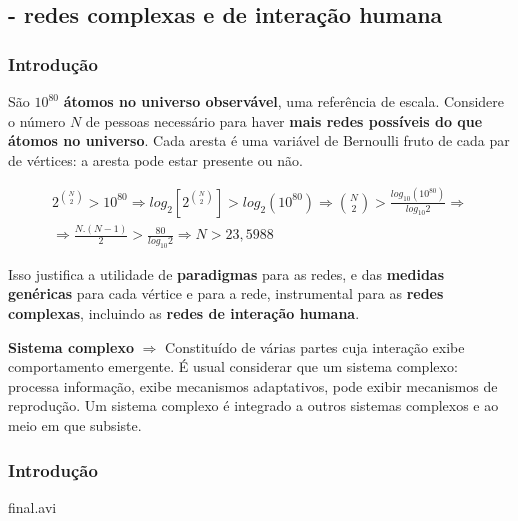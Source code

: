 \documentclass[10pt]{beamer}
\begin{document}
\subsection{- redes complexas e de interação humana}
\begin{frame}
\frametitle{Introdução}
São $10^{80}$ {\bf átomos no universo observável},
uma referência de escala.
Considere o número $N$ de pessoas necessário para
haver {\bf mais redes possíveis do que átomos no universo}.
Cada aresta é uma variável de Bernoulli fruto de cada
par de vértices: a aresta pode estar presente ou não.

\begin{align}
2^{N \choose 2} > 10^{80} \Rightarrow 
log_2[2^{N \choose 2}] > log_2(10^{80}) \Rightarrow
{N \choose 2} > \frac{log_{10}(10^{80})}{log_{10}2} \Rightarrow \nonumber\\
\Rightarrow \frac{N.(N-1)}{2} > \frac{80}{log_{10}2} \Rightarrow
	N > 23,5988 \;\;\;\;\;\;\;\;\;\;\;\;\;\;\;\;\;\;\;\;\;
	\nonumber
\end{align}

Isso justifica a utilidade de {\bf \color{red} paradigmas} para as redes,
e das {\bf \color{red} medidas genéricas} para cada vértice e para a rede,
instrumental para as {\bf redes complexas}, incluindo
as {\bf redes de interação humana}.

{\bf Sistema complexo} $\Rightarrow$ 
Constituído de várias partes cuja interação exibe
comportamento emergente.
É usual considerar que um sistema complexo:
processa informação, exibe mecanismos adaptativos, 
pode exibir mecanismos de reprodução.
 Um sistema complexo é integrado a outros sistemas complexos
e ao meio em que subsiste.
\end{frame}


\begin{frame}
\frametitle{Introdução}
\begin{center}
%
{final.avi} %
\end{center}
\end{frame}
\end{document}
